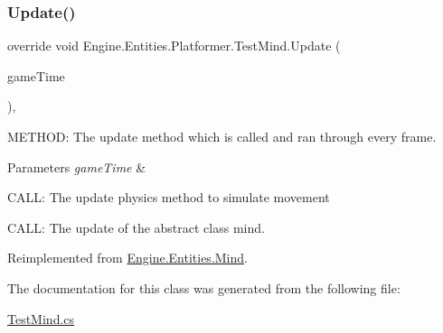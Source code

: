 \subsubsection{\texorpdfstring{Update()}{Update()}}
{\footnotesize\ttfamily override void Engine.\+Entities.\+Platformer.\+Test\+Mind.\+Update (\begin{DoxyParamCaption}\item[{Game\+Time}]{game\+Time }\end{DoxyParamCaption})\hspace{0.3cm}{\ttfamily [inline]}, {\ttfamily [virtual]}}



M\+E\+T\+H\+OD\+: The update method which is called and ran through every frame. 


\begin{DoxyParams}{Parameters}
{\em game\+Time} & \\
\hline
\end{DoxyParams}
C\+A\+LL\+: The update physics method to simulate movement

C\+A\+LL\+: The update of the abstract class mind. 

Reimplemented from \hyperlink{a00318_adec6999d87accf7371de1536eac2541b}{Engine.\+Entities.\+Mind}.



The documentation for this class was generated from the following file\+:\begin{DoxyCompactItemize}
\item 
\hyperlink{a00032}{Test\+Mind.\+cs}\end{DoxyCompactItemize}
